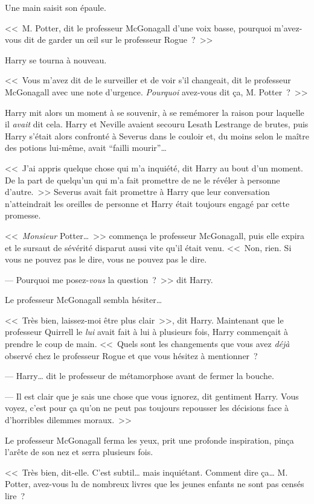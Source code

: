 Une main saisit son épaule.

<<~M. Potter, dit le professeur McGonagall d'une voix basse, pourquoi m'avez-vous dit de garder un œil sur le professeur Rogue~?~>>

Harry se tourna à nouveau.

<<~Vous m'avez dit de le surveiller et de voir s'il changeait, dit le professeur McGonagall avec une note d'urgence. \emph{Pourquoi} avez-vous dit ça, M. Potter~?~>>

Harry mit alors un moment à se souvenir, à se remémorer la raison pour laquelle il \emph{avait} dit cela. Harry et Neville avaient secouru Lesath Lestrange de brutes, puis Harry s'était alors confronté à Severus dans le couloir et, du moins selon le maître des potions lui-même, avait “failli mourir”…

<<~J'ai appris quelque chose qui m'a inquiété, dit Harry au bout d'un moment. De la part de quelqu'un qui m'a fait promettre de ne le révéler à personne d'autre.~>> Severus avait fait promettre à Harry que leur conversation n'atteindrait les oreilles de personne et Harry était toujours engagé par cette promesse.

<<~\emph{Monsieur} Potter…~>> commença le professeur McGonagall, puis elle expira et le sursaut de sévérité disparut aussi vite qu'il était venu. <<~Non, rien. Si vous ne pouvez pas le dire, vous ne pouvez pas le dire.

--- Pourquoi me posez-\emph{vous} la question~?~>> dit Harry.

Le professeur McGonagall sembla hésiter…

<<~Très bien, laissez-moi être plus clair~>>, dit Harry. Maintenant que le professeur Quirrell le \emph{lui} avait fait à lui à plusieurs fois, Harry commençait à prendre le coup de main. <<~Quels sont les changements que vous avez \emph{déjà} observé chez le professeur Rogue et que vous hésitez à mentionner~?

--- Harry… dit le professeur de métamorphose avant de fermer la bouche.

--- Il est clair que je sais une chose que vous ignorez, dit gentiment Harry. Vous voyez, c'est pour ça qu'on ne peut pas toujours repousser les décisions face à d'horribles dilemmes moraux.~>>

Le professeur McGonagall ferma les yeux, prit une profonde inspiration, pinça l'arête de son nez et serra plusieurs fois.

<<~Très bien, dit-elle. C'est subtil… mais inquiétant. Comment dire ça… M. Potter, avez-vous lu de nombreux livres que les jeunes enfants ne sont pas censés lire~?

